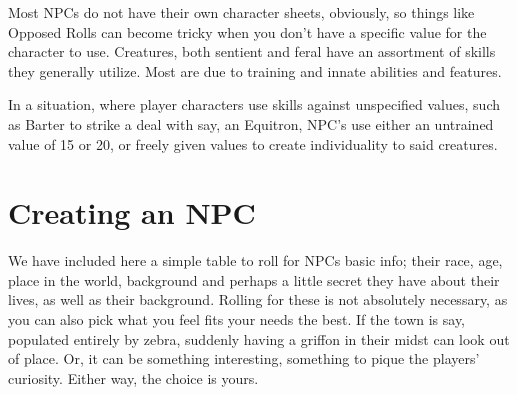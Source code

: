 \documentclass[11pt,a4paper,twocolumn]{book}
\begin{document}
    Most NPCs do not have their own character sheets, obviously, so things like Opposed Rolls can become tricky when you don't have a specific value for the character to use. Creatures, both sentient and feral have an assortment of skills they generally utilize. Most are due to training and innate abilities and features. 
    
    In a situation, where player characters use skills against unspecified values, such as Barter to strike a deal with say, an Equitron, NPC's use either an untrained value of 15 or 20, or freely given values to create individuality to said creatures.
    
    
    \clearpage
    \section*{Creating an NPC}
    
    We have included here a simple table to roll for NPCs basic info; their race, age, place in the world, background and perhaps a little secret they have about their lives, as well as their background. Rolling for these is not absolutely necessary, as you can also pick what you feel fits your needs the best. If the town is say, populated entirely by zebra, suddenly having a griffon in their midst can look out of place. Or, it can be something interesting, something to pique the players' curiosity. Either way, the choice is yours.
    
\end{document}
